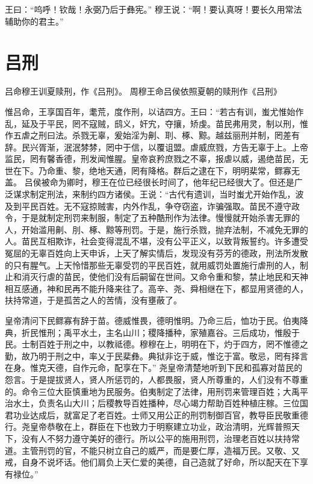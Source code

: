\documentclass[a4paper,12pt,UTF8,twoside]{ctexbook}
\begin{document}
王曰：“呜呼！钦哉！永弼乃后于彝宪。”
穆王说：“啊！要认真呀！要长久用常法辅助你的君主。”

\chapter{吕刑}

吕命穆王训夏赎刑，作《吕刑》。
周穆王命吕侯依照夏朝的赎刑作《吕刑》

惟吕命，王享国百年，耄荒，度作刑，以诘四方。王曰：“若古有训，蚩尤惟始作乱，延及于平民，罔不寇贼，鸱义，奸宄，夺攘，矫虔。苗民弗用灵，制以刑，惟作五虐之刑曰法。杀戮无辜，爰始淫为劓、刵、椓、黥。越兹丽刑并制，罔差有辞。民兴胥渐，泯泯棼棼，罔中于信，以覆诅盟。虐威庶戮，方告无辜于上。上帝监民，罔有馨香德，刑发闻惟腥。皇帝哀矜庶戮之不辜，报虐以威，遏绝苗民，无世在下。乃命重、黎，绝地天通，罔有降格。群后之逮在下，明明棐常，鳏寡无盖。
吕侯被命为卿时，穆王在位已经很长时间了，他年纪已经很大了。但还是广泛谋求制定刑法，来制约四方诸侯。王说：“古代有遗训，当时蚩尤开始作乱，波及到平民百姓。无不寇掠贼害，内外作乱，争夺窃盗，诈骗强取。苗民不遵守政令，于是就制定刑罚来制服，制定了五种酷刑作为法律。慢慢就开始杀害无罪的人，开始滥用劓、刖、椓、黥等刑罚。于是，施行杀戮，抛弃法制，不减免无罪的人。苗民互相欺诈，社会变得混乱不堪，没有公平正义，以致背叛誓约。许多遭受冤屈的无辜百姓向上天申诉，上天了解实情后，发现没有芬芳的德政，刑法所发散的只有腥气。上天怜惜那些无辜受罚的平民百姓，就用威罚处置施行虐刑的人，制止和消灭行虐的苗民，使他们没有后嗣留在世间。又命令重和黎，禁止地民和天神相互感通，神和民再不能升降来往了。高辛、尧、舜相继在下，都显用贤德的人，扶持常道，于是孤苦之人的苦情，没有壅蔽了。

皇帝清问下民鳏寡有辞于苗。德威惟畏，德明惟明。乃命三后，恤功于民。伯夷降典，折民惟刑；禹平水土，主名山川；稷降播种，家殖嘉谷。三后成功，惟殷于民。士制百姓于刑之中，以教祗德。穆穆在上，明明在下，灼于四方，罔不惟德之勤，故乃明于刑之中，率乂于民棐彝。典狱非讫于威，惟讫于富。敬忌，罔有择言在身。惟克天德，自作元命，配享在下。”
尧皇帝清楚地听到下民和孤寡对苗民的怨言。于是提拔贤人，贤人所惩罚的，人都畏服，贤人所尊重的，人们没有不尊重的。命令三位大臣慎重地为民服务。伯夷制定了法律，用刑罚来管理百姓；大禹平治水土，负责名山大川；后稷教导百姓播种，尽心竭力帮助百姓种植庄稼。三位国君功业达成后，就富足了老百姓。士师又用公正的刑罚制御百官，教导臣民敬重德行。尧皇帝恭敬在上，群臣在下也致力于明察建立功业，政治清明，光辉普照天下，没有人不努力遵守美好的德行。所以公平的施用刑罚，治理老百姓以扶持常道。主管刑罚的官，不能只树立自己的威严，而是要仁厚，造福万民。又敬、又戒，自身不说坏话。他们肩负上天仁爱的美德，自己造就了好命，所以配天在下享有禄位。”
\end{document}
